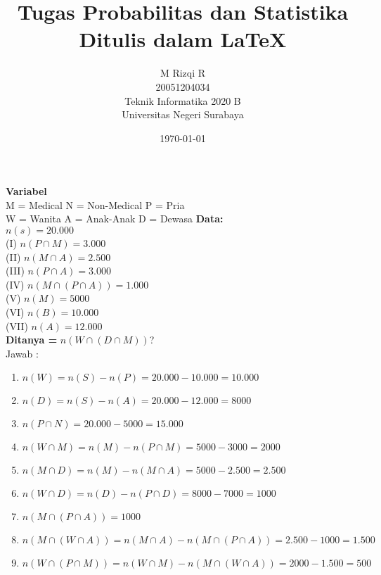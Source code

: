 \documentclass{article}
\title{\LARGE \textbf {\huge{Tugas Probabilitas dan Statistika\\}
}
    Ditulis dalam \textbf{\LaTeX}
}
\author{
    M Rizqi R\\
    20051204034\\
    Teknik Informatika 2020 B\\
    Universitas Negeri Surabaya\\
}
\date{\today}
\begin{document}
    \maketitle
    \begin{multicols*}{2}
    \section{}
    \textbf{Variabel\\}
    M = Medical 
    N = Non-Medical
    P = Pria\\
    W = Wanita
    A = Anak-Anak
    D = Dewasa
    \hfill \break
    \textbf{Data: \\}
    $n(s) = 20.000$\\
    (I)     $n(P \cap M) = 3.000$\\ 
    (II)    $n(M \cap A) = 2.500$\\
    (III)   $n(P \cap A) = 3.000$\\
    (IV)   $n(M \cap (P \cap A)) = 1.000$\\
    (V)         $n(M)=5000$\\
    (VI)        $n(B)=10.000$\\
    (VII)       $n(A)=12.000$\\
    \textbf{Ditanya =} $n(W \cap(D \cap M))$?\\
    \hfill\break
    Jawab :
    \begin{enumerate}
        \item $n(W) = n(S)-n(P)=20.000-10.000=10.000$
        \item $n(D) = n(S)-n(A)=20.000-12.000=8000$
        \item $n(P \cap N) = 20.000 - 5000=15.000$
        \item $n(W \cap M) = n(M) - n(P\cap M) = 5000-3000=2000$
        \item $n(M \cap D) = n(M)-n(M \cap A) = 5000-2.500=2.500$
        \item $n(W \cap D) = n(D)-n(P \cap D) = 8000-7000=1000$
        \item $n(M \cap (P \cap A)) = 1000$
        \item $n(M \cap (W \cap A)) =n(M \cap A)-n(M \cap (P \cap A))=
        2.500-1000= 1.500$ 
        \item $n(W \cap (P \cap M)) = n(W \cap M)-n(M \cap(W \cap A))
        =2000-1.500=500$ \end{enumerate}

\end{multicols*}
\end{document}

